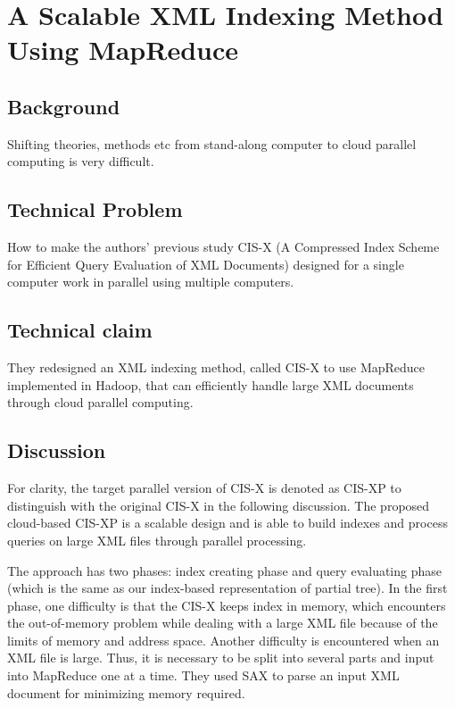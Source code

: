 \documentclass{paper}
\begin{document}
	
	\section{A Scalable XML Indexing Method Using MapReduce}	%
	
	\subsection{Background}
	
	Shifting theories, methods etc from stand-along computer to cloud 
	parallel computing is very difficult. 
	
	\subsection{Technical Problem}
	
	How to make the authors' previous study CIS-X (A Compressed Index
	Scheme for Efficient Query Evaluation of XML Documents) designed for a
	single computer work in parallel using multiple computers.
	
	\subsection{Technical claim}
	
	They redesigned an XML indexing method, called CIS-X to use MapReduce
	implemented in Hadoop, that can efficiently handle large XML documents
	through cloud parallel computing.  
	
	\subsection{Discussion}

	For clarity, the target parallel version of CIS-X is denoted 
	as CIS-XP to distinguish with the original CIS-X in the following discussion.
	The proposed cloud-based CIS-XP is a scalable design and is able to
	build indexes and process queries on large XML files through parallel
	processing. 
	
	
	The approach has two phases: index creating phase and query evaluating
	phase (which is the same as our index-based representation of partial
	tree).  In the first phase, one difficulty is that the CIS-X keeps
	index in memory, which encounters the out-of-memory problem while
	dealing with a large XML file because of the limits of memory and
	address space. Another difficulty is encountered when an XML file is 
	large. Thus, it is necessary to be split into several parts and 
	input into MapReduce one at a time. They used SAX to parse an input XML 
	document for minimizing memory required. 
	
\end{document}
